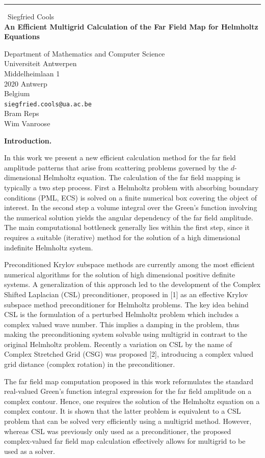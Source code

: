 \documentclass{report}
\begin{document}
\begin{center}
\rule{6in}{1pt} \
{\large Siegfried Cools \\
{\bf An Efficient Multigrid Calculation of the Far Field Map for Helmholtz Equations}}

Department of Mathematics and Computer Science \\ Universiteit Antwerpen \\ Middelheimlaan 1 \\ 2020 Antwerp \\ Belgium
\\
{\tt siegfried.cools@ua.ac.be}\\
Bram Reps\\
Wim Vanroose\end{center}

\textbf{Introduction.}

In this work we present a new efficient calculation method for the far
field amplitude patterns that arise from scattering problems governed by
the $d$-dimensional Helmholtz equation. The calculation of the far field
mapping is typically a two step process. First a Helmholtz problem with
absorbing boundary conditions (PML, ECS) is solved on a finite numerical
box covering the object of interest. In the second step a volume integral
over the Green's function involving the numerical solution yields the
angular dependency of the far field amplitude. The main computational
bottleneck generally lies within the first step, since it requires a
suitable (iterative) method for the solution of a high dimensional
indefinite Helmholtz system.

Preconditioned Krylov subspace methods are currently among the most
efficient numerical algorithms for the solution of high dimensional
positive definite systems. A generalization of this approach led to the
development of the Complex Shifted Laplacian (CSL) preconditioner,
proposed in [1] as an effective Krylov subspace method preconditioner for
Helmholtz problems. The key idea behind CSL is the formulation of a
perturbed Helmholtz problem which includes a complex valued wave number.
This implies a damping in the problem, thus making the preconditioning
system solvable using multigrid in contrast to the original Helmholtz
problem. Recently a variation on CSL by the name of Complex Stretched
Grid (CSG) was proposed [2], introducing a complex valued grid distance
(complex rotation) in the preconditioner.

The far field map computation proposed in this work reformulates the
standard real-valued Green's function integral expression for the far
field amplitude on a complex contour. Hence, one requires the solution of
the Helmholtz equation on a complex contour. It is shown that the latter
problem is equivalent to a CSL problem that can be solved very
efficiently using a multigrid method. However, whereas CSL was previously
only used as a preconditioner, the proposed complex-valued far field map
calculation effectively allows for multigrid to be used as a solver.
\end{document}
